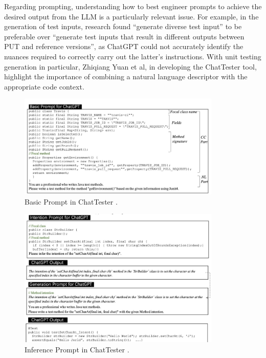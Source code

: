 Regarding prompting, understanding how to best engineer prompts to achieve the desired output from the LLM is a particularly relevant issue. For example, in the generation of test inputs, research found “generate diverse test input” to be preferable over “generate test inputs that result in different outputs between PUT and reference versions”, as ChatGPT could not accurately identify the nuances required to correctly carry out the latter's instructions. \citep{kn:nuances}
With unit testing generation in particular, Zhiqiang Yuan et al, in developing the ChatTester tool, highlight the importance of combining a natural language descriptor with the appropriate code context\citep{kn:chattester}.
\begin{figure}[!h]
    \includegraphics[width=0.86\textwidth]{figures/basicprompt.jpg}
    \caption{Basic Prompt in ChatTester \citep{kn:chattester}.}
    \label{fig:arch}
\end{figure}
\begin{figure}[!h]
    \includegraphics[width=0.86\textwidth]{figures/inferenceprompt.jpg}
    \caption{Inference Prompt in ChatTester \citep{kn:chattester}.}
    \label{fig:arch}
\end{figure}

